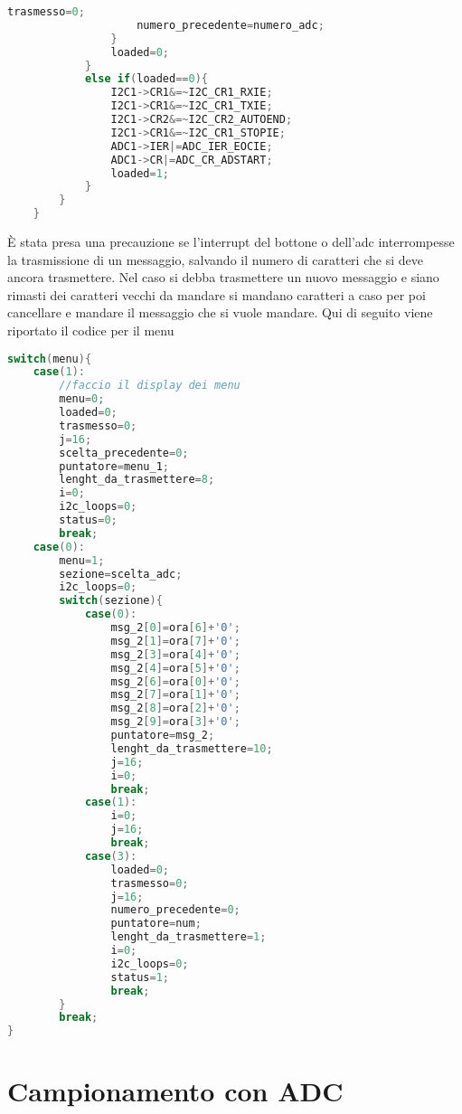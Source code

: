 \documentclass[main.tex]{subfiles}
\begin{document}
\begin{lstlisting}[caption=Porzione codice impostazioni, language=C]
					trasmesso=0;
					numero_precedente=numero_adc;
				}
				loaded=0;
			}
			else if(loaded==0){
				I2C1->CR1&=~I2C_CR1_RXIE;
				I2C1->CR1&=~I2C_CR1_TXIE;
				I2C1->CR2&=~I2C_CR2_AUTOEND;
				I2C1->CR1&=~I2C_CR1_STOPIE;
				ADC1->IER|=ADC_IER_EOCIE;
				ADC1->CR|=ADC_CR_ADSTART;
				loaded=1;
			}
		}
	}
\end{lstlisting}
È stata presa una precauzione se l'interrupt del bottone o dell'adc interrompesse la trasmissione di un messaggio, salvando il numero di caratteri che si deve ancora trasmettere. Nel caso si debba trasmettere un nuovo messaggio e siano rimasti dei caratteri vecchi da mandare si mandano caratteri a caso per poi cancellare e mandare il messaggio che si vuole mandare. 
Qui di seguito viene riportato il codice per il menu
\begin{lstlisting}[caption=Menu, language=C]
switch(menu){
	case(1):
		//faccio il display dei menu
		menu=0;
		loaded=0;
		trasmesso=0;
		j=16;
		scelta_precedente=0;
		puntatore=menu_1;
		lenght_da_trasmettere=8;
		i=0;
		i2c_loops=0;
		status=0;
		break;
	case(0):
		menu=1;
		sezione=scelta_adc;
		i2c_loops=0;
		switch(sezione){
			case(0):
				msg_2[0]=ora[6]+'0';
				msg_2[1]=ora[7]+'0';
				msg_2[3]=ora[4]+'0';
				msg_2[4]=ora[5]+'0';
				msg_2[6]=ora[0]+'0';
				msg_2[7]=ora[1]+'0';
				msg_2[8]=ora[2]+'0';
				msg_2[9]=ora[3]+'0';
				puntatore=msg_2;
				lenght_da_trasmettere=10;
				j=16;
				i=0;
				break;
			case(1):
				i=0;
				j=16;
                break;
			case(3):
				loaded=0;
				trasmesso=0;
				j=16;
				numero_precedente=0;
				puntatore=num;
				lenght_da_trasmettere=1;
				i=0;
				i2c_loops=0;
				status=1;
                break;
		}
		break;
}
\end{lstlisting}

\section{Campionamento con ADC}
\end{document}
